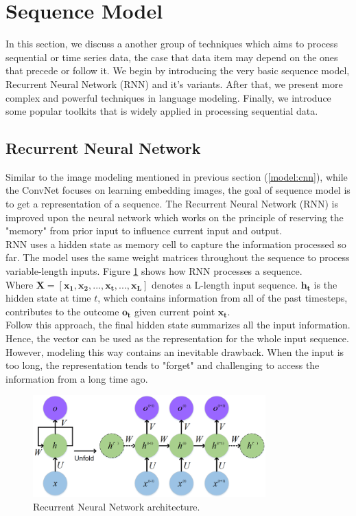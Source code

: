 \section{Sequence Model}
In this section, we discuss a another group of techniques which aims to process sequential or time series data, the case that data item may depend on the ones that precede or follow it. 
We begin by introducing the very basic sequence model, Recurrent Neural Network (RNN) and it's variants. After that, we present more complex and powerful techniques in language modeling. Finally, we introduce some popular toolkits that is widely applied in processing sequential data.
\subsection{Recurrent Neural Network}
Similar to the image modeling mentioned in previous section (\ref{model:cnn}), while the ConvNet focuses on learning embedding images, the goal of sequence model is to get a representation of a sequence. 
The Recurrent Neural Network (RNN) is improved upon the neural network which works on the principle of reserving the "memory" from prior input to influence current input and output. \\
RNN uses a hidden state as memory cell to capture the information processed so far. The model uses the same weight matrices throughout the sequence to process variable-length inputs.
Figure \ref{fig:rnn} shows how RNN processes a sequence. \\
Where $\mathbf{X} = [\mathbf{x_{1}}, \mathbf{x_{2}}, ..., \mathbf{x_{t}}, ..., \mathbf{x_{L}}]$ denotes a L-length input sequence. $\mathbf{h_{t}}$ is the hidden state at time $t$, which contains information from all of the past timesteps, contributes to the outcome $\mathbf{o_{t}}$ given current point $\mathbf{x_{t}}$. \\
Follow this approach, the final hidden state summarizes all the input information. Hence, the vector can be used as the representation for the whole input sequence. 
However, modeling this way contains an inevitable drawback. When the input is too long, the representation tends to "forget" and challenging to access the information from a long time ago.
\begin{figure}[t!]
    \centering
    \includegraphics[width=0.8\textwidth]{resources/images/RNN.png}
    \caption{Recurrent Neural Network architecture.}
    \label{fig:rnn}
\end{figure}
